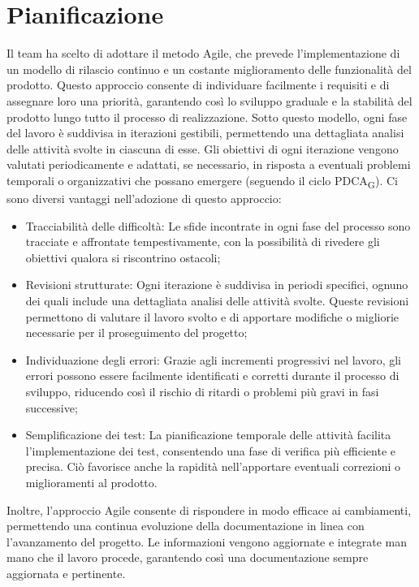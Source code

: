 \documentclass{article}
\begin{document}
\section{Pianificazione}
Il team ha scelto di adottare il metodo Agile, che prevede l'implementazione di un modello di rilascio continuo e un costante miglioramento delle funzionalità del prodotto. Questo approccio consente di individuare facilmente i requisiti e di assegnare loro una priorità, garantendo così lo sviluppo graduale e la stabilità del prodotto lungo tutto il processo di realizzazione. Sotto questo modello, ogni fase del lavoro è suddivisa in iterazioni gestibili, permettendo una dettagliata analisi delle attività svolte in ciascuna di esse. Gli obiettivi di ogni iterazione vengono valutati periodicamente e adattati, se necessario, in risposta a eventuali problemi temporali o organizzativi che possano emergere (seguendo il ciclo PDCA\textsubscript{G}). Ci sono diversi vantaggi nell'adozione di questo approccio:
\begin{itemize}
    \item Tracciabilità delle difficoltà: Le sfide incontrate in ogni fase del processo sono tracciate e affrontate tempestivamente, con la possibilità di rivedere gli obiettivi qualora si riscontrino ostacoli;
    \item Revisioni strutturate: Ogni iterazione è suddivisa in periodi specifici, ognuno dei quali include una dettagliata analisi delle attività svolte. Queste revisioni permettono di valutare il lavoro svolto e di apportare modifiche o migliorie necessarie per il proseguimento del progetto;
    \item Individuazione degli errori: Grazie agli incrementi progressivi nel lavoro, gli errori possono essere facilmente identificati e corretti durante il processo di sviluppo, riducendo così il rischio di ritardi o problemi più gravi in fasi successive;
    \item Semplificazione dei test: La pianificazione temporale delle attività facilita l'implementazione dei test, consentendo una fase di verifica più efficiente e precisa. Ciò favorisce anche la rapidità nell'apportare eventuali correzioni o miglioramenti al prodotto.
\end{itemize}

Inoltre, l'approccio Agile consente di rispondere in modo efficace ai cambiamenti, permettendo una continua evoluzione della documentazione in linea con l'avanzamento del progetto. Le informazioni vengono aggiornate e integrate man mano che il lavoro procede, garantendo così una documentazione sempre aggiornata e pertinente.
\end{document}

